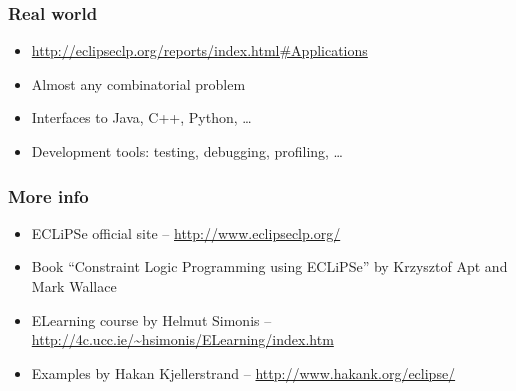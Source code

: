 \documentclass{beamer}
\begin{document}
\begin{frame}
\frametitle{Real world}
\begin{itemize}
\item \url{http://eclipseclp.org/reports/index.html\#Applications}
\item Almost any combinatorial problem
\item Interfaces to Java, C++, Python, \dots
\item Development tools: testing, debugging, profiling, \dots
\end{itemize}
\end{frame}

\begin{frame}
\frametitle{More info}
\begin{itemize}
\item ECLiPSe official site -- \url{http://www.eclipseclp.org/}
\item Book ``Constraint Logic Programming using ECLiPSe'' by Krzysztof Apt and Mark Wallace
\item ELearning course by Helmut Simonis -- \url{http://4c.ucc.ie/~hsimonis/ELearning/index.htm}
\item Examples by Hakan Kjellerstrand -- \url{http://www.hakank.org/eclipse/}
\end{itemize}
\end{frame}
\end{document}

